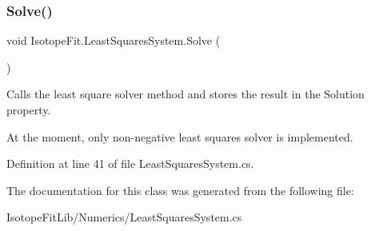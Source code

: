 \subsubsection{\texorpdfstring{Solve()}{Solve()}}
{\footnotesize\ttfamily void Isotope\+Fit.\+Least\+Squares\+System.\+Solve (\begin{DoxyParamCaption}{ }\end{DoxyParamCaption})}



Calls the least square solver method and stores the result in the Solution property. 

At the moment, only non-\/negative least squares solver is implemented. 

Definition at line 41 of file Least\+Squares\+System.\+cs.



The documentation for this class was generated from the following file\+:\begin{DoxyCompactItemize}
\item 
Isotope\+Fit\+Lib/\+Numerics/Least\+Squares\+System.\+cs\end{DoxyCompactItemize}
